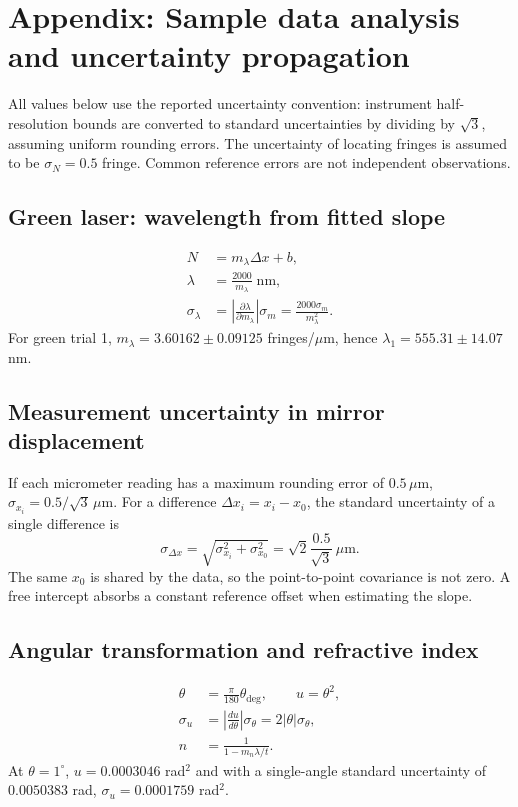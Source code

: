 \section*{Appendix: Sample data analysis and uncertainty propagation}
\noindent All values below use the reported uncertainty convention: instrument
half-resolution bounds are converted to standard uncertainties by dividing by $\sqrt{3}$,
assuming uniform rounding errors. The uncertainty of locating fringes is assumed to be
$\sigma_N=0.5$ fringe. Common reference errors are not independent observations.

\subsection*{Green laser: wavelength from fitted slope}
\begin{align*}
N &= m_\lambda\Delta x+b,\\
\lambda &=\frac{2000}{m_\lambda}\;\mathrm{nm},\\
\sigma_\lambda &=\left|\frac{\partial\lambda}{\partial m_\lambda}\right|\sigma_m
=\frac{2000\sigma_m}{m_\lambda^2}.
\end{align*}
For green trial 1, $m_\lambda=3.60162\pm0.09125$ fringes/$\mu$m, hence
$\lambda_1=555.31\pm14.07$ nm.

\subsection*{Measurement uncertainty in mirror displacement}
If each micrometer reading has a maximum rounding error of $0.5\,\mu$m,
$\sigma_{x_i}=0.5/\sqrt{3}\,\mu$m. For a difference
$\Delta x_i=x_i-x_0$, the standard uncertainty of a single difference is
\[
\sigma_{\Delta x}=\sqrt{\sigma_{x_i}^2+\sigma_{x_0}^2}
=\sqrt{2}\frac{0.5}{\sqrt3}\,\mu\mathrm m.
\]
The same $x_0$ is shared by the data, so the point-to-point covariance is not zero.
A free intercept absorbs a constant reference offset when estimating the slope.

\subsection*{Angular transformation and refractive index}
\begin{align*}
\theta &= \frac{\pi}{180}\theta_{\mathrm{deg}},\qquad u=\theta^2,\\
\sigma_u&=\left|\frac{du}{d\theta}\right|\sigma_\theta=2|\theta|\sigma_\theta,\\
n&=\frac{1}{1-m_n\lambda/t}.
\end{align*}
At $\theta=1^\circ$, $u=0.0003046$ rad$^2$ and with a single-angle
standard uncertainty of $0.0050383$ rad, $\sigma_u=0.0001759$ rad$^2$.

